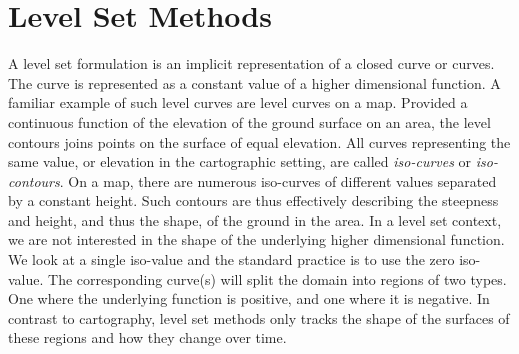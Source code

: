\chapter{Level Set Methods}
A level set formulation is an implicit representation of a closed curve or curves. 
The curve is represented as a constant value of a higher dimensional function.
A familiar example of such level curves are level curves on a map. Provided 
a continuous function of the elevation of the ground surface on an area, the level
contours joins points on the surface of equal elevation. All curves representing the 
same value, or elevation in the cartographic setting, are called \textit{iso-curves} or
\textit{iso-contours}. On a map, there are numerous iso-curves of different values 
separated by a constant height. Such contours are thus effectively describing
the steepness and height, and thus the shape, of the ground in the area. 
In a level set context, we are not interested in the shape of the underlying 
higher dimensional function. We look at a single iso-value and the standard 
practice is to use the zero iso-value. The corresponding curve(s) will 
split the domain into regions of two types. One where the underlying function is 
positive, and one where it is negative. In contrast to cartography, level set 
methods only tracks the shape of the surfaces of these regions and how they 
change over time.

\newpage
